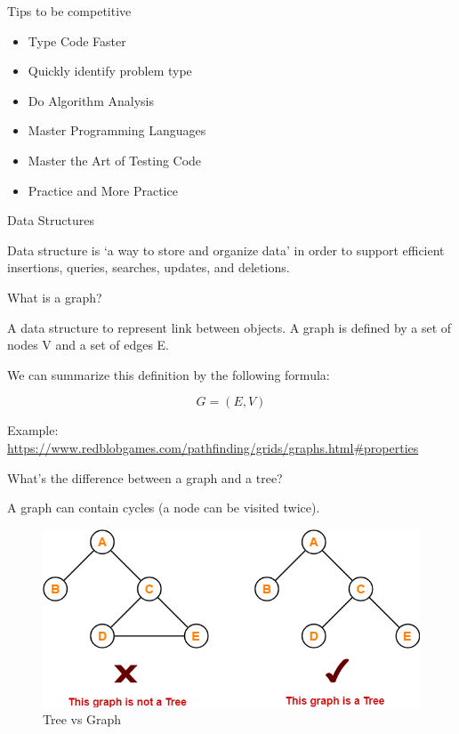 \documentclass[ignorenonframetext,]{beamer}
\providecommand{\tightlist}{%
  \setlength{\itemsep}{0pt}\setlength{\parskip}{0pt}}
\begin{document}
\begin{frame}{Tips to be competitive}
\protect\hypertarget{tips-to-be-competitive}{}

\begin{itemize}
\tightlist
\item
  Type Code Faster
\item
  Quickly identify problem type
\item
  Do Algorithm Analysis
\item
  Master Programming Languages
\item
  Master the Art of Testing Code
\item
  Practice and More Practice
\end{itemize}

\end{frame}

\begin{frame}{Data Structures}
\protect\hypertarget{data-structures}{}

Data structure is `a way to store and organize data' in order to support
eﬃcient insertions, queries, searches, updates, and deletions.

\end{frame}

\begin{frame}{What is a graph?}
\protect\hypertarget{what-is-a-graph}{}

A data structure to represent link between objects. A graph is defined
by a set of nodes V and a set of edges E.

We can summarize this definition by the following formula:

\[
G = (E, V)
\]

Example:
\url{https://www.redblobgames.com/pathfinding/grids/graphs.html\#properties}

\end{frame}

\begin{frame}{What's the difference between a graph and a tree?}
\protect\hypertarget{whats-the-difference-between-a-graph-and-a-tree}{}

A graph can contain cycles (a node can be visited twice).

\begin{figure}
\centering
\includegraphics[width=\textwidth,height=2.08333in]{Tree-Data-Structure-Example.png}
\caption{Tree vs Graph}
\end{figure}

\end{frame}
\end{document}
